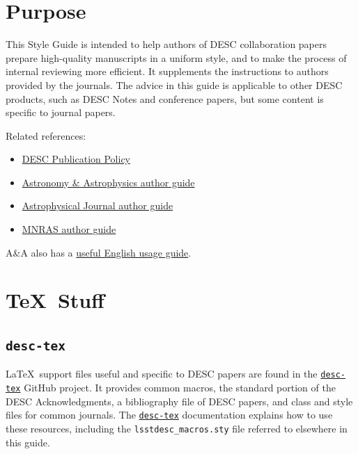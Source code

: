 \documentclass[letterpaper,11pt]{article}
\begin{document}
\section{Purpose}

This Style Guide is intended to help authors of DESC collaboration papers prepare
high-quality manuscripts in a uniform style, and to make the process of internal reviewing more efficient. It supplements the instructions
to authors provided by the journals.  The advice in this guide is applicable to other DESC products, such as DESC Notes and conference papers, but some content is specific to journal papers.

Related references:
\begin{itemize}
\item{\href{http://lsst-desc.org/sites/default/files/LSST_DESC_Publication_Policy_v6_15aug2016.pdf}{DESC Publication Policy}}

\item{\href{https://www.aanda.org/doc_journal/instructions/aadoc.pdf}{Astronomy \& Astrophysics author guide}}

\item{\href{http://journals.aas.org/authors/manuscript.html}{Astrophysical Journal author guide}}

\item \href{https://academic.oup.com/mnras/pages/General_Instructions}{MNRAS author guide}
\end{itemize}


A\&A also has a \href{http://www.aanda.org/doc_journal/instructions/aa_english_guide.pdf}{useful English usage guide}. 

\section{\TeX\ Stuff}

\subsection{\tt desc-tex}

La\TeX\ support files useful and specific to DESC papers are found in
the \href{https://github.com/LSSTDESC/desc-tex}{\tt desc-tex} GitHub project.
It provides common macros, the standard portion of the DESC Acknowledgments, a bibliography file of DESC papers, and class and style files for common journals.
The \href{https://github.com/LSSTDESC/desc-tex}{\tt desc-tex} documentation explains how to use these resources, including the {\tt lsstdesc\_macros.sty} file referred to elsewhere in this guide.
\end{document}

